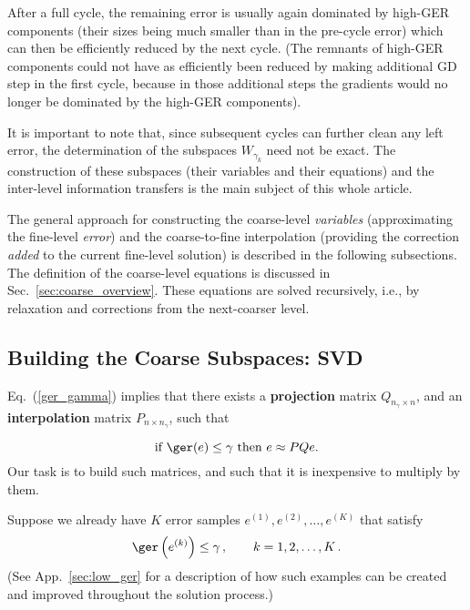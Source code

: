 \documentclass{article} %
\begin{document}
After a full cycle, the remaining error is usually again dominated by high-GER components (their sizes being much smaller than in the pre-cycle error) which can then be efficiently reduced by the next cycle. (The remnants of high-GER components could not have as efficiently been reduced by making additional GD step in the first cycle, because in those additional steps the gradients would no longer be dominated by the high-GER components).

It is important to note that, since subsequent cycles can further clean any left error, the determination of the subspaces $W_{\gamma_k}$ need not be exact. The construction of these subspaces (their variables and their equations) and the inter-level information transfers is the main subject of this whole article.

The general approach for constructing the coarse-level {\it variables} (approximating the fine-level {\it error}) and the coarse-to-fine interpolation (providing the correction {\it added} to the current fine-level solution) is described in the following subsections. The definition of the coarse-level equations is discussed in Sec.~\ref{sec:coarse_overview}. These equations are solved recursively, i.e., by relaxation and corrections from the next-coarser level.

\subsection{Building the Coarse Subspaces: SVD}
\label{sec:w_gamma}

Eq.~(\ref{ger_gamma}) implies that there exists a \textbf{projection} matrix $Q_{n_{\gamma} \times n}$, and an \textbf{interpolation} matrix $P_{n \times n_{\gamma}}$, such that

\begin{equation}
	{\mbox{if $\ger(e) \leq \gamma$ then $e \approx P Q e$.}}
	\label{pqe}
\end{equation}
Our task is to build such matrices, and such that it is inexpensive to multiply by them.

Suppose we already have $K$ error samples $e^{(1)}, e^{(2)}, \dots, e^{(K)}$ that satisfy
\begin{equation}
	\ger\left(e^{(k)} \right) \leq \gamma\,, \qquad k = 1, 2, \dots, K\,.
	\label{ger_ek}
\end{equation}
(See App.~\ref{sec:low_ger} for a description of how such examples can be created and improved throughout the solution process.)
\end{document}
